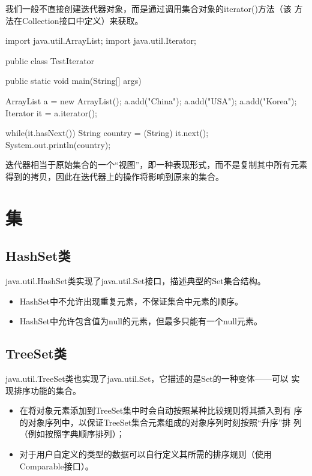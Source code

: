 我们一般不直接创建迭代器对象，而是通过调用集合对象的iterator()方法（该
方法在Collection接口中定义）来获取。


\begin{javaCode}
  import java.util.ArrayList;
  import java.util.Iterator;

  public class TestIterator {
    public static void main(String[] args) {
      ArrayList a = new ArrayList();
      a.add("China");
      a.add("USA");
      a.add("Korea");
      Iterator it = a.iterator();
      
      while(it.hasNext()) {
        String country = (String) it.next();
        System.out.println(country);
      }
    }
  }
\end{javaCode}

迭代器相当于原始集合的一个“视图”，即一种表现形式，而不是复制其中所有元素得到的拷贝，因此在迭代器上的操作将影响到原来的集合。

\section{集}

\subsection{HashSet类}

java.util.HashSet类实现了java.util.Set接口，描述典型的Set集合结构。

\begin{itemize}
\item HashSet中不允许出现重复元素，不保证集合中元素的顺序。
\item HashSet中允许包含值为null的元素，但最多只能有一个null元素。
\end{itemize}

\subsection{TreeSet类}

java.util.TreeSet类也实现了java.util.Set，它描述的是Set的一种变体——可以
实现排序功能的集合。

\begin{itemize}
\item 在将对象元素添加到TreeSet集中时会自动按照某种比较规则将其插入到有
  序的对象序列中，以保证TreeSet集合元素组成的对象序列时刻按照“升序”排
  列（例如按照字典顺序排列）；
\item 对于用户自定义的类型的数据可以自行定义其所需的排序规则（使用Comparable接口）。
\end{itemize}


